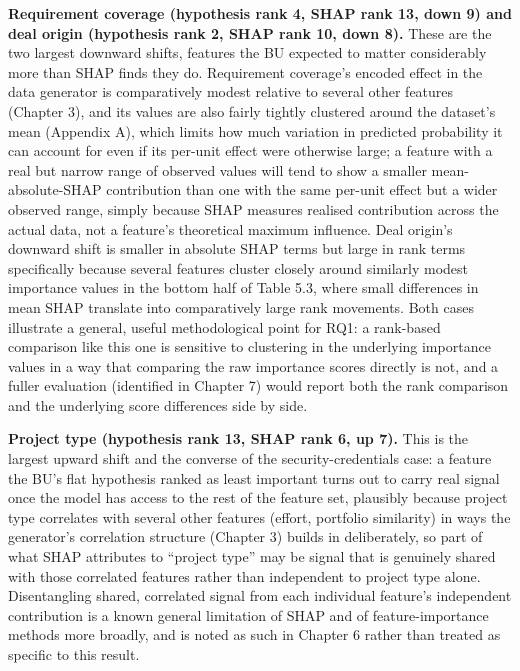 \documentclass[12pt,oneside]{report}
\begin{document}
\textbf{Requirement coverage (hypothesis rank 4, SHAP rank 13, down 9)
and deal origin (hypothesis rank 2, SHAP rank 10, down 8).} These are
the two largest downward shifts, features the BU expected to matter
considerably more than SHAP finds they do. Requirement coverage's
encoded effect in the data generator is comparatively modest relative to
several other features (Chapter 3), and its values are also fairly
tightly clustered around the dataset's mean (Appendix A), which limits
how much variation in predicted probability it can account for even if
its per-unit effect were otherwise large; a feature with a real but
narrow range of observed values will tend to show a smaller
mean-absolute-SHAP contribution than one with the same per-unit effect
but a wider observed range, simply because SHAP measures realised
contribution across the actual data, not a feature's theoretical maximum
influence. Deal origin's downward shift is smaller in absolute SHAP
terms but large in rank terms specifically because several features
cluster closely around similarly modest importance values in the bottom
half of Table 5.3, where small differences in mean
\textbar SHAP\textbar{} translate into comparatively large rank
movements. Both cases illustrate a general, useful methodological point
for RQ1: a rank-based comparison like this one is sensitive to
clustering in the underlying importance values in a way that comparing
the raw importance scores directly is not, and a fuller evaluation
(identified in Chapter 7) would report both the rank comparison and the
underlying score differences side by side.

\textbf{Project type (hypothesis rank 13, SHAP rank 6, up 7).} This is
the largest upward shift and the converse of the security-credentials
case: a feature the BU's flat hypothesis ranked as least important turns
out to carry real signal once the model has access to the rest of the
feature set, plausibly because project type correlates with several
other features (effort, portfolio similarity) in ways the generator's
correlation structure (Chapter 3) builds in deliberately, so part of
what SHAP attributes to ``project type'' may be signal that is genuinely
shared with those correlated features rather than independent to project
type alone. Disentangling shared, correlated signal from each individual
feature's independent contribution is a known general limitation of SHAP
and of feature-importance methods more broadly, and is noted as such in
Chapter 6 rather than treated as specific to this result.
\end{document}
